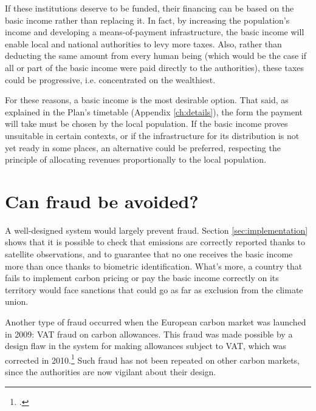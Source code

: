 \documentclass[a5paper,english,openany]{memoir}
\begin{document}
If these institutions deserve to be funded, their financing can be based on the basic income rather than replacing it. In fact, by increasing the population's income and developing a means-of-payment infrastructure, the basic income will enable local and national authorities to levy more taxes. Also, rather than deducting the same amount from every human being (which would be the case if all or part of the basic income were paid directly to the authorities), %
these taxes could be progressive, i.e. concentrated on the wealthiest. 

For these reasons, a basic income is the most desirable option. That said, as explained in the Plan's timetable (Appendix \ref{ch:details}), the form the payment will take must be chosen by the local population. If the basic income proves unsuitable in certain contexts, or if the infrastructure for its distribution is not yet ready in some places, an alternative could be preferred, respecting the principle of allocating revenues proportionally to the local population. 

\section*{\normalsize Can fraud be avoided?}\label{q:fraude}

A well-designed system would largely prevent fraud. Section \ref{sec:implementation} shows that it is possible to check that emissions are correctly reported thanks to satellite observations, and to guarantee that no one %
receives the basic income more than once thanks to biometric identification. What's more, a country that fails to implement carbon pricing or pay the basic income correctly on its territory would face sanctions that could go as far as exclusion from the climate union. 

Another type of fraud occurred when the European carbon market was launched in 2009: %
VAT fraud on carbon allowances. This fraud was made possible by a design flaw in the system for making allowances subject to VAT, which was corrected in 2010.\footnote{\citet{cour_des_comptes_fraude_2012}.} Such fraud has not been repeated on other carbon markets, since the authorities are now vigilant about their design.
\end{document}
